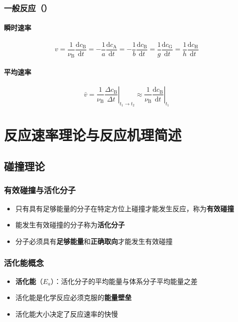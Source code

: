 \subsubsection{一般反应（）}
\paragraph{瞬时速率}
\[
v = \frac{1}{\nu_{\text{B}}} \frac{\mathrm{d}c_{\text{B}}}{\mathrm{d}t} 
= -\frac{1}{a} \frac{\mathrm{d}c_{\text{A}}}{\mathrm{d}t} 
= -\frac{1}{b} \frac{\mathrm{d}c_{\text{B}}}{\mathrm{d}t} 
= \frac{1}{g} \frac{\mathrm{d}c_{\text{G}}}{\mathrm{d}t} 
= \frac{1}{h} \frac{\mathrm{d}c_{\text{H}}}{\mathrm{d}t}
\]

\paragraph{平均速率}
\[
\bar{v} = \frac{1}{\nu_{\text{B}}} \left.\frac{\Delta c_{\text{B}}}{\Delta t}\right|_{t_1 \to t_2} 
\approx \frac{1}{\nu_{\text{B}}} \left.\frac{\mathrm{d}c_{\text{B}}}{\mathrm{d}t}\right|_{t_1}
\]

\section{反应速率理论与反应机理简述}
\subsection{碰撞理论}
\subsubsection{有效碰撞与活化分子}
\begin{itemize}
\item 只有具有足够能量的分子在特定方位上碰撞才能发生反应，称为\textbf{有效碰撞}
\item 能发生有效碰撞的分子称为\textbf{活化分子}
\item 分子必须具有\textbf{足够能量}和\textbf{正确取向}才能发生有效碰撞
\end{itemize}

\subsubsection{活化能概念}
\begin{itemize}
\item \textbf{活化能}（$E_a$）：活化分子的平均能量与体系分子平均能量之差
\item 活化能是化学反应必须克服的\textbf{能量壁垒}
\item 活化能大小决定了反应速率的快慢
\end{itemize}


